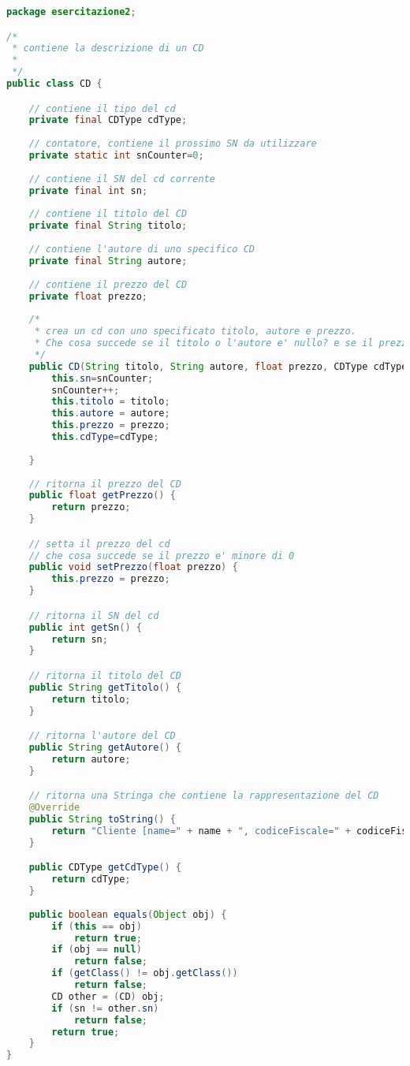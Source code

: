 \documentclass{article}
\begin{document}
\begin{lstlisting}[language=Java,escapechar=|]
package esercitazione2;

/*
 * contiene la descrizione di un CD
 *
 */
public class CD {

	// contiene il tipo del cd
	private final CDType cdType;
	
	// contatore, contiene il prossimo SN da utilizzare
	private static int snCounter=0;
	
	// contiene il SN del cd corrente
	private final int sn;
	
	// contiene il titolo del CD
	private final String titolo;
	
	// contiene l'autore di uno specifico CD
	private final String autore;
	
	// contiene il prezzo del CD
	private float prezzo;
	
	/*
	 * crea un cd con uno specificato titolo, autore e prezzo.
	 * Che cosa succede se il titolo o l'autore e' nullo? e se il prezzo e' minore di 0?
	 */
	public CD(String titolo, String autore, float prezzo, CDType cdType){
		this.sn=snCounter;
		snCounter++;
		this.titolo = titolo;
		this.autore = autore;
		this.prezzo = prezzo;
		this.cdType=cdType;
		
	}
	
	// ritorna il prezzo del CD
	public float getPrezzo() {
		return prezzo;
	}

	// setta il prezzo del cd
	// che cosa succede se il prezzo e' minore di 0
	public void setPrezzo(float prezzo) {
		this.prezzo = prezzo;
	}

	// ritorna il SN del cd
	public int getSn() {
		return sn;
	}

	// ritorna il titolo del CD
	public String getTitolo() {
		return titolo;
	}

	// ritorna l'autore del CD
	public String getAutore() {
		return autore;
	}

	// ritorna una Stringa che contiene la rappresentazione del CD 
	@Override
	public String toString() {
		return "Cliente [name=" + name + ", codiceFiscale=" + codiceFiscale+ "]";
	}

	public CDType getCdType() {
		return cdType;
	}
	
	public boolean equals(Object obj) {
		if (this == obj)
			return true;
		if (obj == null)
			return false;
		if (getClass() != obj.getClass())
			return false;
		CD other = (CD) obj;
		if (sn != other.sn)
			return false;
		return true;
	}
}

\end{lstlisting}
\end{document}
